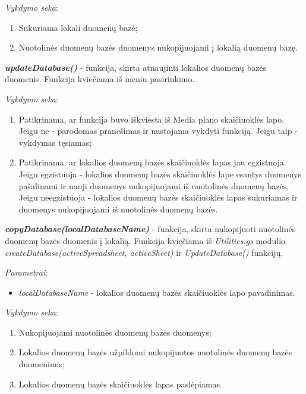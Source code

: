 \bigskip
\textit{Vykdymo seka}:
\begin{enumerate}
    \itemsep0em 
    \item Sukuriama lokali duomenų bazė;
    \item Nuotolinės duomenų bazės duomenys nukopijuojami į lokalią duomenų bazę.
\end{enumerate}

\bigskip
\textit{\textbf{updateDatabase()}} - funkcija, skirta atnaujinti lokalios duomenų bazės duomenis. Funkcija kviečiama iš meniu pasirinkimo.

\bigskip
\textit{Vykdymo seka}:
\begin{enumerate}
    \itemsep0em 
    \item Patikrinama, ar funkcija buvo iškviesta iš Media plano skaičiuoklės lapo. Jeigu ne - parodomas pranešimas ir nustojama vykdyti funkciją. Jeigu taip - vykdymas tęsiamas;
    \item Patikrinama, ar lokalios duomenų bazės skaičiuoklės lapas jau egzistuoja. Jeigu egzistuoja - lokalios duomenų bazės skaičiuoklės lape esantys duomenys pašalinami ir nauji duomenys nukopijuojami iš nuotolinės duomenų bazės. Jeigu neegzistuoja - lokalios duomenų bazės skaičiuoklės lapas sukuriamas ir duomenys nukopijuojami iš nuotolinės duomenų bazės.
\end{enumerate}

\bigskip
\textit{\textbf{copyDatabase(localDatabaseName)}} - funkcija, skirta nukopijuoti nuotolinės duomenų bazės duomenis į lokalią. Funkcija kviečiama iš \textit{Utilities.gs} modulio \textit{createDatabase(activeSpreadsheet, activeSheet)} ir \textit{UpdateDatabase()} funkcijų.

\bigskip
\textit{Parametrai}:
\begin{itemize}
    \itemsep0em 
    \item \textit{localDatabaseName} - lokalios duomenų bazės skaičiuoklės lapo pavadinimas.
\end{itemize}

\bigskip
\textit{Vykdymo seka}:
\begin{enumerate}
    \itemsep0em 
    \item Nukopijuojami nuotolinės duomenų bazės duomenys;
    \item Lokalios duomenų bazės užpildomi nukopijuotos nuotolinės duomenų bazės duomenimis;
    \item Lokalios duomenų bazės skaičiuoklės lapas paslėpiamas.
\end{enumerate}

